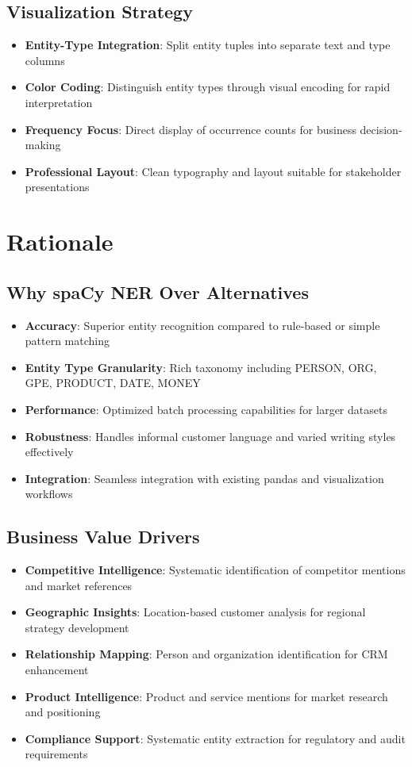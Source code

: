 \documentclass[11pt]{article}
\begin{document}
\subsection{Visualization Strategy}
\begin{itemize}
\item \textbf{Entity-Type Integration}: Split entity tuples into separate text and type columns
\item \textbf{Color Coding}: Distinguish entity types through visual encoding for rapid interpretation
\item \textbf{Frequency Focus}: Direct display of occurrence counts for business decision-making
\item \textbf{Professional Layout}: Clean typography and layout suitable for stakeholder presentations
\end{itemize}

\section{Rationale}

\subsection{Why spaCy NER Over Alternatives}
\begin{itemize}
\item \textbf{Accuracy}: Superior entity recognition compared to rule-based or simple pattern matching
\item \textbf{Entity Type Granularity}: Rich taxonomy including PERSON, ORG, GPE, PRODUCT, DATE, MONEY
\item \textbf{Performance}: Optimized batch processing capabilities for larger datasets
\item \textbf{Robustness}: Handles informal customer language and varied writing styles effectively
\item \textbf{Integration}: Seamless integration with existing pandas and visualization workflows
\end{itemize}

\subsection{Business Value Drivers}
\begin{itemize}
\item \textbf{Competitive Intelligence}: Systematic identification of competitor mentions and market references
\item \textbf{Geographic Insights}: Location-based customer analysis for regional strategy development
\item \textbf{Relationship Mapping}: Person and organization identification for CRM enhancement
\item \textbf{Product Intelligence}: Product and service mentions for market research and positioning
\item \textbf{Compliance Support}: Systematic entity extraction for regulatory and audit requirements
\end{itemize}
\end{document}
